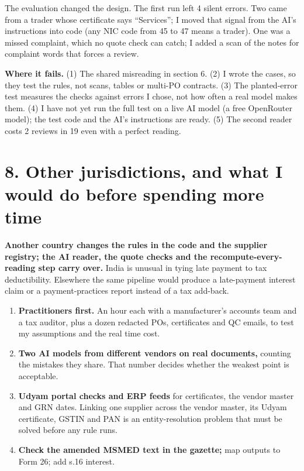 \documentclass[10pt,a4paper]{article}
\providecommand{\tightlist}{\setlength{\itemsep}{1.5pt}\setlength{\parskip}{0pt}}
\begin{document}
The evaluation changed the design. The first run left 4 silent errors. Two came from a trader whose certificate says ``Services''; I moved that signal from the AI's instructions into code (any NIC code from 45 to 47 means a trader). One was a missed complaint, which no quote check can catch; I added a scan of the notes for complaint words that forces a review.

\textbf{Where it fails.} (1) The shared misreading in section 6. (2) I wrote the cases, so they test the rules, not scans, tables or multi-PO contracts. (3) The planted-error test measures the checks against errors I chose, not how often a real model makes them. (4) I have not yet run the full test on a live AI model (a free OpenRouter model); the test code and the AI's instructions are ready. (5) The second reader costs 2 reviews in 19 even with a perfect reading.

\section*{8. Other jurisdictions, and what I would do before spending more time}

\textbf{Another country changes the rules in the code and the supplier registry; the AI reader, the quote checks and the recompute-every-reading step carry over.} India is unusual in tying late payment to tax deductibility. Elsewhere the same pipeline would produce a late-payment interest claim or a payment-practices report instead of a tax add-back.

\begin{enumerate}
\def\labelenumi{\arabic{enumi}.}
\tightlist
\item
  \textbf{Practitioners first.} An hour each with a manufacturer's accounts team and a tax auditor, plus a dozen redacted POs, certificates and QC emails, to test my assumptions and the real time cost.
\item
  \textbf{Two AI models from different vendors on real documents,} counting the mistakes they share. That number decides whether the weakest point is acceptable.
\item
  \textbf{Udyam portal checks and ERP feeds} for certificates, the vendor master and GRN dates. Linking one supplier across the vendor master, its Udyam certificate, GSTIN and PAN is an entity-resolution problem that must be solved before any rule runs.
\item
  \textbf{Check the amended MSMED text in the gazette;} map outputs to Form 26; add s.16 interest.
\end{enumerate}
\end{document}
